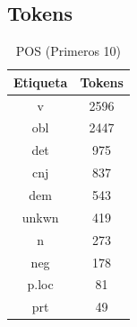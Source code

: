 \documentclass[letterpaper,12pt,oneside]{book}
\begin{document}
	
	\subsection{Tokens}

	
	\begin{table}

		\centering

		\begin{tabular}{c | c}

			\textbf{Etiqueta} & \textbf{Tokens} \\ \hline \hline

			v & 2596 \\

			obl & 2447 \\

			det & 975 \\

			cnj & 837 \\

			dem & 543 \\

			unkwn & 419 \\

			n & 273 \\

			neg & 178 \\

			p.loc & 81 \\

			prt & 49 \\

		\end{tabular}

		\caption{POS (Primeros 10)}

		\label{table_pos_tokens}

	\end{table}

	
	
\end{document}
